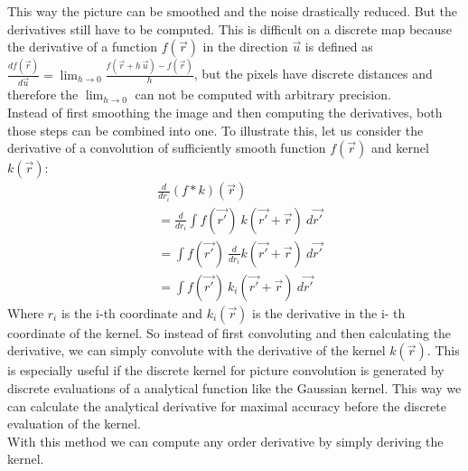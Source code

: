 \documentclass[12pt,english,twocolumn]{revtex4}
\begin{document}
This way the picture can be smoothed and the noise drastically reduced. But the derivatives still have to be computed. This is difficult on a discrete map because the derivative of a function $f(\Vec{r})$ in the direction $\Vec{u}$ is defined as $\frac{df(\Vec{r})}{d\Vec{u}} = \lim_{h\to 0}\frac{f(\Vec{r}+h \, \Vec{u}) - f(\Vec{r})}{h}$, but the pixels have discrete distances and therefore the $\lim_{h\to0}$ can not be computed with arbitrary precision.\\
Instead of first smoothing the image and then computing the derivatives, both those steps can be combined into one. To illustrate this, let us consider the derivative of a  convolution of sufficiently smooth function $f(\Vec{r})$ and kernel $k(\Vec{r})$: \\
\begin{align*}
    &\frac{d}{d r_{i}}(f * k)(\Vec{r})\\
    &= \frac{d}{d r_{i}} \int f(\Vec{r'}) \ k(\Vec{r'} + \Vec{r}) \ d\Vec{r'}\\
    &= \int f(\Vec{r'}) \  \frac{d}{d r_{i}}k(\Vec{r'} + \Vec{r}) \ d\Vec{r'}\\
    &= \int f(\Vec{r'}) \ k_{i}(\Vec{r'} + \Vec{r}) \ d\Vec{r'}
\end{align*}
Where $r_{i}$ is the i-th coordinate and $k_{i}(\Vec{r})$ is the derivative in the i- th coordinate of the kernel. So instead of first convoluting and then calculating the derivative, we can simply convolute with the derivative of the kernel $k(\Vec{r})$. This is especially useful if the discrete kernel for picture convolution is generated by discrete evaluations of a analytical function like the Gaussian kernel. This way we can calculate the analytical derivative for maximal accuracy before the discrete evaluation of the kernel.\\
With this method we can compute any order derivative by simply deriving the kernel.
\end{document}
